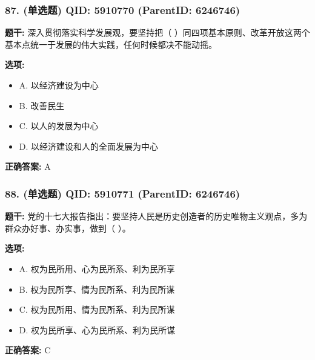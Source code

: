 \documentclass[12pt,UTF8]{ctexart}
\begin{document}
\subsubsection*{87. (单选题) \small QID: 5910770 (ParentID: 6246746)}

\textbf{题干:}
深入贯彻落实科学发展观，要坚持把（ ）同四项基本原则、改革开放这两个基本点统一于发展的伟大实践，任何时候都决不能动摇。



\textbf{选项:}
\begin{itemize}[leftmargin=*]

  \item A. 以经济建设为中心

  \item B. 改善民生

  \item C. 以人的发展为中心

  \item D. 以经济建设和人的全面发展为中心

\end{itemize}

\textbf{正确答案:}
A

\vspace{0.3em}\hrulefill\vspace{0.7em}

\subsubsection*{88. (单选题) \small QID: 5910771 (ParentID: 6246746)}

\textbf{题干:}
党的十七大报告指出：要坚持人民是历史创造者的历史唯物主义观点，多为群众办好事、办实事，做到（ ）。



\textbf{选项:}
\begin{itemize}[leftmargin=*]

  \item A. 权为民所用、心为民所系、利为民所享

  \item B. 权为民所享、情为民所系、利为民所谋

  \item C. 权为民所用、情为民所系、利为民所谋

  \item D. 权为民所享、心为民所系、利为民所谋

\end{itemize}

\textbf{正确答案:}
C
\end{document}
